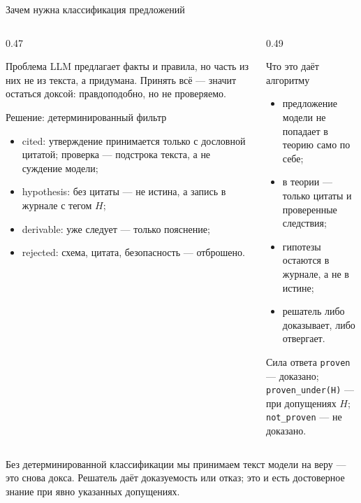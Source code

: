 \documentclass[aspectratio=169,11pt]{beamer}
\newcommand{\Logos}[1]{\textcolor{logoscolor}{#1}}
\newcommand{\Hyp}[1]{\textcolor{hypocolor}{#1}}
\newcommand{\Rej}[1]{\textcolor{rejectcolor}{#1}}
\newcommand{\Prov}[1]{\textcolor{provencolor}{#1}}
\begin{document}
\begin{frame}[shrink=4]{Зачем нужна классификация предложений}
  \footnotesize
  \begin{columns}[T,onlytextwidth]
    \begin{column}{0.47\textwidth}
      \begin{block}{Проблема}
        LLM предлагает факты и правила, но часть из них не из текста,
        а придумана. Принять всё --- значит остаться доксой:
        правдоподобно, но не проверяемо.
      \end{block}
      \begin{block}{Решение: детерминированный фильтр}
        \begin{itemize}
          \item \Logos{cited}: утверждение принимается только с дословной
                цитатой; проверка --- подстрока текста, а не суждение модели;
          \item \Hyp{hypothesis}: без цитаты --- не истина, а запись
                в журнале с тегом \(H\);
          \item \Prov{derivable}: уже следует --- только пояснение;
          \item \Rej{rejected}: схема, цитата, безопасность --- отброшено.
        \end{itemize}
      \end{block}
    \end{column}
    \begin{column}{0.49\textwidth}
      \begin{block}{Что это даёт алгоритму}
        \begin{itemize}
          \item предложение модели не попадает в теорию само по себе;
          \item в теории --- только цитаты и проверенные следствия;
          \item гипотезы остаются в журнале, а не в истине;
          \item решатель либо доказывает, либо отвергает.
        \end{itemize}
      \end{block}
      \begin{block}{Сила ответа}
        \Prov{\texttt{proven}} --- доказано;\\
        \Hyp{\texttt{proven\_under(H)}} --- при допущениях \(H\);\\
        \texttt{not\_proven} --- не доказано.
      \end{block}
    \end{column}
  \end{columns}

  \vspace{1mm}
  {\footnotesize Без детерминированной классификации мы принимаем текст модели
  на веру --- это снова докса. Решатель даёт доказуемость или отказ; это и
  есть достоверное знание при явно указанных допущениях.}
\end{frame}
\end{document}
